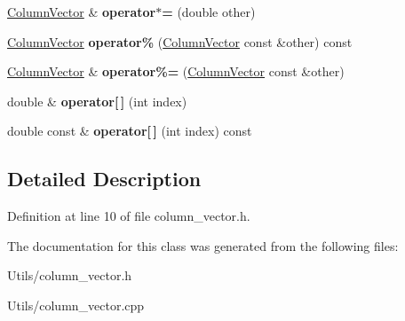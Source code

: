 \begin{DoxyCompactItemize}
\hyperlink{classColumnVector}{Column\+Vector} \& {\bfseries operator$\ast$=} (double other)
\item 
\mbox{\label{classColumnVector_a509eb2c7108dd1870f7282a3eb9038c1}} 
\hyperlink{classColumnVector}{Column\+Vector} {\bfseries operator\%} (\hyperlink{classColumnVector}{Column\+Vector} const \&other) const
\item 
\mbox{\label{classColumnVector_afe72f924a5a097ad3386576c6fe950bf}} 
\hyperlink{classColumnVector}{Column\+Vector} \& {\bfseries operator\%=} (\hyperlink{classColumnVector}{Column\+Vector} const \&other)
\item 
\mbox{\label{classColumnVector_a27f20757b2d702147f5b70a966e17b6c}} 
double \& {\bfseries operator\mbox{[}$\,$\mbox{]}} (int index)
\item 
\mbox{\label{classColumnVector_a205d763788746d98810ec1d7541fc20f}} 
double const  \& {\bfseries operator\mbox{[}$\,$\mbox{]}} (int index) const
\end{DoxyCompactItemize}


\subsection{Detailed Description}


Definition at line 10 of file column\+\_\+vector.\+h.



The documentation for this class was generated from the following files\+:\begin{DoxyCompactItemize}
\item 
Utils/column\+\_\+vector.\+h\item 
Utils/column\+\_\+vector.\+cpp\end{DoxyCompactItemize}
